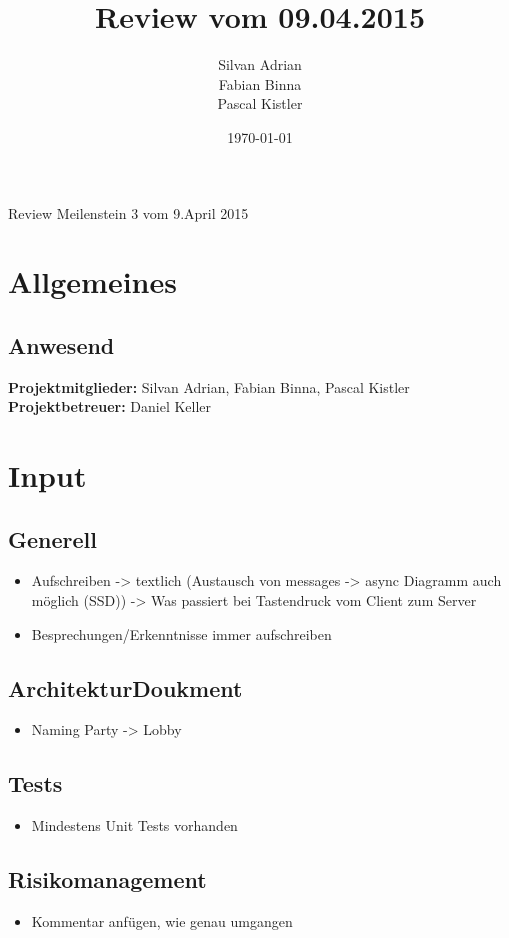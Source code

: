 \documentclass[11pt]{scrartcl}
\title{Review vom 09.04.2015}
\author{Silvan Adrian \\ Fabian Binna \\ Pascal Kistler}
\date{\today{}}
\begin{document}
{\huge Review Meilenstein 3 vom 9.April 2015}

\section{Allgemeines}
\label{sec:Allgemein}

\subsection{Anwesend}
\label{sec:Anwesend}
\textbf{Projektmitglieder:} Silvan Adrian, Fabian Binna, Pascal Kistler \\
\textbf{Projektbetreuer:} Daniel Keller
\section{Input}
\subsection{Generell}
\begin{itemize}
  \item Aufschreiben -> textlich (Austausch von messages -> 
  async Diagramm auch möglich (SSD))
-> Was passiert bei Tastendruck vom Client zum Server
  \item Besprechungen/Erkenntnisse immer aufschreiben
\end{itemize}

\subsection{ArchitekturDoukment}
\begin{itemize}
  \item Naming Party -> Lobby
\end{itemize}

\subsection{Tests}
\begin{itemize}
   \item Mindestens Unit Tests vorhanden
\end{itemize}

\subsection{Risikomanagement}
\begin{itemize}
  \item Kommentar anfügen, wie genau umgangen
\end{itemize}
\end{document}
